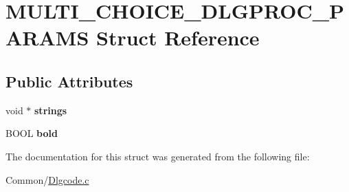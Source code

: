 \hypertarget{struct_m_u_l_t_i___c_h_o_i_c_e___d_l_g_p_r_o_c___p_a_r_a_m_s}{}\section{M\+U\+L\+T\+I\+\_\+\+C\+H\+O\+I\+C\+E\+\_\+\+D\+L\+G\+P\+R\+O\+C\+\_\+\+P\+A\+R\+A\+MS Struct Reference}
\label{struct_m_u_l_t_i___c_h_o_i_c_e___d_l_g_p_r_o_c___p_a_r_a_m_s}
\subsection*{Public Attributes}
\begin{DoxyCompactItemize}
\item 
\mbox{\label{struct_m_u_l_t_i___c_h_o_i_c_e___d_l_g_p_r_o_c___p_a_r_a_m_s_a52a2f65cc4c16b5d54ecda57afe0f51e}} 
void $\ast$ {\bfseries strings}
\item 
\mbox{\label{struct_m_u_l_t_i___c_h_o_i_c_e___d_l_g_p_r_o_c___p_a_r_a_m_s_a8b85c547188b0eac330941d72a3083f3}} 
B\+O\+OL {\bfseries bold}
\end{DoxyCompactItemize}


The documentation for this struct was generated from the following file\+:\begin{DoxyCompactItemize}
\item 
Common/\hyperlink{_dlgcode_8c}{Dlgcode.\+c}\end{DoxyCompactItemize}
